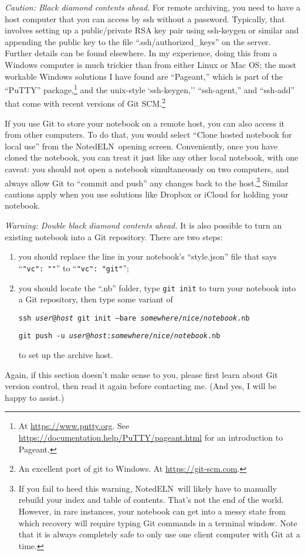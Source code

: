 \documentclass[11pt]{report}
\def\terminal#1{{\tt#1}}
\newcommand{\NotedELN}{NotedELN} %
\begin{document}
\emph{Caution: Black diamond contents ahead.} For remote archiving,
you need to have a host computer that you can access by ssh without a
password. Typically, that involves setting up a public/private RSA key
pair using ssh-keygen or similar and appending the public key to the
file ``.ssh/authorized\_keys'' on the server. Further details can be
found elsewhere. In my experience, doing this from a Windows computer
is much trickier than from either Linux or Mac OS; the most workable
Windows solutions I have found are ``Pageant,'' which is part of the
``PuTTY'' package,\footnote{At \url{https://www.putty.org}. See
  \url{https://documentation.help/PuTTY/pageant.html} for an introduction to
  Pageant.} and the unix-style `ssh-keygen,'' ``ssh-agent,'' and
``ssh-add'' that come with recent versions of Git SCM.\footnote{An
  excellent port of git to Windows. At \url{https://git-scm.com}.}

If you use Git to store your notebook on a remote host,
you can also access it from other computers. To do that, you would
select ``Clone hosted notebook for local use'' from the \NotedELN\ opening
screen. Conveniently, once you have cloned the notebook, you can treat
it just like any other local notebook, with one caveat: you should not
open a notebook simultaneously on two computers, and always allow Git
to ``commit and push'' any changes back to the host.\footnote{If you fail to
heed this warning, \NotedELN\ will likely have to manually rebuild your index
and table of contents. That's not the end of the world. However, in
rare instances, your notebook can get into a messy state from which
recovery will require typing Git commands in a terminal window. Note
that it is always completely safe to only use one client computer with
Git at a time.} Similar cautions apply when you use solutions like
Dropbox or iCloud for holding your notebook.

\emph{Warning: Double black diamond contents ahead.} It is also
possible to turn an existing notebook into a Git repository. There are
two steps:
\begin{enumerate}
  \item you should replace the line in your notebook's
    ``style.json'' file that says ``{\tt"vc":~""}'' to ``{\tt"vc":~"git"}'';
    \item you
should locate the ``.nb'' folder, type \terminal{git init} to turn your
notebook into a Git repository, then type some variant of

\terminal{ssh
\emph{user}@\emph{host} git init --bare
\emph{somewhere}/\emph{nice}/\emph{notebook}.nb}\vspace{-5pt}

\terminal{git push -u
\emph{user}@\emph{host}:\emph{somewhere}/\emph{nice}/\emph{notebook}.nb}

to set up the archive host.
\end{enumerate}
Again, if this section doesn't make sense to you, please first learn
about Git version control, then read it again before
contacting me. (And yes, I will be happy to assist.)
\end{document}
